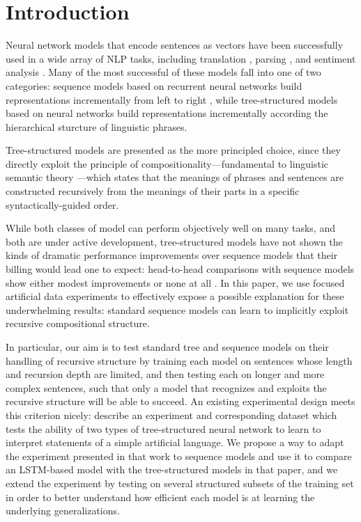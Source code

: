 \section{Introduction}\label{sec:intro}

Neural network models that encode sentences as vectors have been successfully used in a wide array of NLP tasks, including translation \cite{sutskever2014sequence}, parsing \cite{dyer2015transition}, and sentiment analysis \cite{tai2015improved}. Many of the most successful of these models fall into one of two categories: sequence models based on recurrent neural networks build representations incrementally from left to right \cite{elman1990finding,sutskever2014sequence}, while tree-structured models based on  neural networks \cite{goller1996learning,socher2011semi} build representations incrementally according the hierarchical sturcture of linguistic phrases. 

Tree-structured models are presented as the more principled choice, since they directly exploit the principle of compositionality---fundamental to linguistic semantic theory \cite{Partee84,Janssen97}---which states that the meanings of phrases and sentences are constructed recursively from the meanings of their parts in a specific syntactically-guided order.

While both classes of model can perform objectively well on many tasks, and both are under active development, tree-structured models have not shown the kinds of dramatic performance improvements over sequence models that their billing would lead one to expect: head-to-head comparisons with sequence models show either modest improvements \cite{tai2015improved} or none at all \cite{li2015tree}. 
In this paper, we use focused artificial data experiments to effectively expose a possible explanation for these underwhelming results: standard sequence models can learn to implicitly exploit recursive compositional structure.

In particular, our aim is to test standard tree and sequence models on their handling of recursive structure by training each model on sentences whose length and recursion depth are limited, and then testing each on longer and more complex sentences, such that only a model that recognizes and exploits the recursive structure will be able to succeed. An existing experimental design meets this criterion nicely:  describe an experiment and corresponding dataset which tests the ability of two types of tree-structured neural network to learn to interpret statements of a simple artificial language. We propose a way to adapt the experiment presented in that work to sequence models and use it to compare an LSTM-based model with the tree-structured models in that paper, and we extend the experiment by testing on several structured subsets of the training set in order to better understand how efficient each model is at learning the underlying generalizations.

